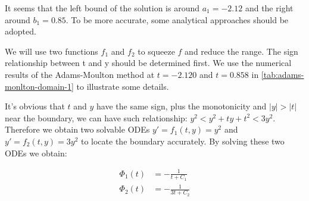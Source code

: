 \documentclass[a4paper]{article}
\begin{document}
	It seems that the left bound of the solution is around $a_1 = -2.12$ and the right around $b_1 = 0.85$. To be more accurate, some analytical approaches should be adopted. 
	
	We will use two functions $f_1$ and $f_2$ to squeeze $f$ and reduce the range. The sign relationship between t and y should be determined first. We use the numerical results of the Adams-Moulton method at $t = -2.120$ and $t = 0.858$ in \autoref{tab:adams-monlton-domain-1} to illustrate some details.
	
    \begin{table}[H]
    \centering
    \caption{y of The Results of The Adams-Moulton Method When t = -2.120 And t = 0.858}
    \label{tab:adams-monlton-domain-1}
    \end{table}
    
    It's obvious that $t$ and $y$ have the same sign, plus the monotonicity and $|y| > |t|$ near the boundary, we can have such relationship: $y^2 < y^2 + ty + t^2 < 3y^2$. Therefore we obtain two solvable ODEs $y' = f_1(t, y) = y^2$ and $y' = f_2(t, y) = 3y^2$ to locate the boundary accurately. By solving these two ODEs we obtain:
    
    \begin{align}
        \Phi_1(t) &= -\frac{1}{t + C_1} \\
        \Phi_2(t) &= -\frac{1}{3t + C_2}
    \end{align}
    
\end{document}
